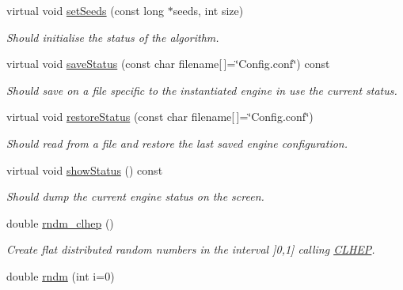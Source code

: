 \begin{DoxyCompactItemize}
virtual void \hyperlink{class_d_d4hep_1_1_simulation_1_1_geant4_random_af110cf82c38501f6a437f3b0b7fc9bf4}{setSeeds} (const long $\ast$seeds, int size)
\begin{DoxyCompactList}\small\item\em Should initialise the status of the algorithm. \item\end{DoxyCompactList}\item 
virtual void \hyperlink{class_d_d4hep_1_1_simulation_1_1_geant4_random_aa8f56d1e097951d747ae3251cc845992}{saveStatus} (const char filename\mbox{[}$\,$\mbox{]}=\char`\"{}Config.conf\char`\"{}) const 
\begin{DoxyCompactList}\small\item\em Should save on a file specific to the instantiated engine in use the current status. \item\end{DoxyCompactList}\item 
virtual void \hyperlink{class_d_d4hep_1_1_simulation_1_1_geant4_random_aad43065d6a4213d3ac0f3d9d024ce5ff}{restoreStatus} (const char filename\mbox{[}$\,$\mbox{]}=\char`\"{}Config.conf\char`\"{})
\begin{DoxyCompactList}\small\item\em Should read from a file and restore the last saved engine configuration. \item\end{DoxyCompactList}\item 
virtual void \hyperlink{class_d_d4hep_1_1_simulation_1_1_geant4_random_a523d8d48f4a11d28ae471a8f385151d7}{showStatus} () const 
\begin{DoxyCompactList}\small\item\em Should dump the current engine status on the screen. \item\end{DoxyCompactList}\item 
double \hyperlink{class_d_d4hep_1_1_simulation_1_1_geant4_random_a691d3cc880c5db6fab4699784a8b375c}{rndm\_\-clhep} ()
\begin{DoxyCompactList}\small\item\em Create flat distributed random numbers in the interval \mbox{]}0,1\mbox{]} calling \hyperlink{namespace_c_l_h_e_p}{CLHEP}. \item\end{DoxyCompactList}\item 
double \hyperlink{class_d_d4hep_1_1_simulation_1_1_geant4_random_a4aaab596ee59a7ae5cbee9cbfde250d5}{rndm} (int i=0)

\end{DoxyCompactItemize}
